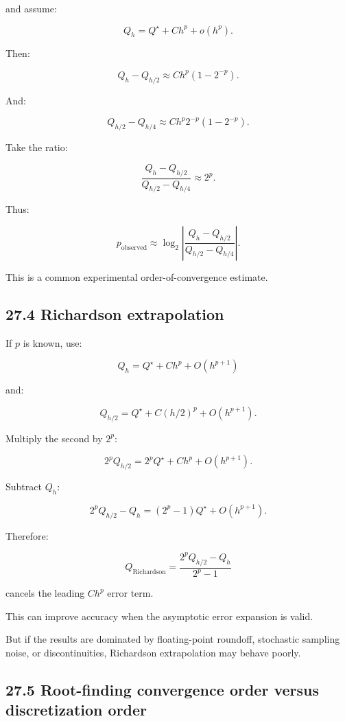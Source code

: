 and assume:

\[ Q_h=Q^\star+Ch^p+o(h^p). \]

Then:

\[ Q_h-Q_{h/2} \approx Ch^p(1-2^{-p}). \]

And:

\[ Q_{h/2}-Q_{h/4} \approx Ch^p2^{-p}(1-2^{-p}). \]

Take the ratio:

\[ \frac{Q_h-Q_{h/2}} {Q_{h/2}-Q_{h/4}} \approx 2^p. \]

Thus:

\[ \boxed{ p_{\mathrm{observed}} \approx \log_2\left| \frac{Q_h-Q_{h/2}} {Q_{h/2}-Q_{h/4}} \right| }. \]

This is a common experimental order-of-convergence estimate.

\subsection{27.4 Richardson extrapolation}\label{02-foundations-ii-ch029-richardson-extrapolation}

\hypertarget{02-foundations-ii-ch029-richardson-extrapolation}{}

If \(p\) is known, use:

\[ Q_h=Q^\star+Ch^p+O(h^{p+1}) \]

and:

\[ Q_{h/2}=Q^\star+C(h/2)^p+O(h^{p+1}). \]

Multiply the second by \(2^p\):

\[ 2^pQ_{h/2} = 2^pQ^\star+Ch^p+O(h^{p+1}). \]

Subtract \(Q_h\):

\[ 2^pQ_{h/2}-Q_h = (2^p-1)Q^\star+O(h^{p+1}). \]

Therefore:

\[ \boxed{ Q_{\mathrm{Richardson}} = \frac{2^pQ_{h/2}-Q_h}{2^p-1} } \]

cancels the leading \(Ch^p\) error term.

This can improve accuracy when the asymptotic error expansion is valid.

But if the results are dominated by floating-point roundoff, stochastic sampling noise, or discontinuities, Richardson extrapolation may behave poorly.

\subsection{27.5 Root-finding convergence order versus discretization order}\label{02-foundations-ii-ch029-root-finding-convergence-order-versus-discretization-order}

